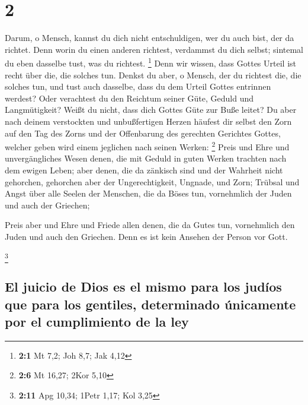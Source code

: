 \hypertarget{section-1}{%
\section{2}\label{section-1}}

 Darum, o Mensch, kannst du dich nicht entschuldigen, wer
du auch bist, der da richtet. Denn worin du einen anderen richtest,
verdammst du dich selbst; sintemal du eben dasselbe tust, was du
richtest. \footnote{\textbf{2:1} Mt 7,2; Joh 8,7; Jak 4,12}
 Denn wir wissen, dass Gottes Urteil ist recht über die,
die solches tun.  Denkst du aber, o Mensch, der du
richtest die, die solches tun, und tust auch dasselbe, dass du dem
Urteil Gottes entrinnen werdest?  Oder verachtest du den
Reichtum seiner Güte, Geduld und Langmütigkeit? Weißt du nicht, dass
dich Gottes Güte zur Buße leitet?  Du aber nach deinem
verstockten und unbußfertigen Herzen häufest dir selbst den Zorn auf den
Tag des Zorns und der Offenbarung des gerechten Gerichtes Gottes,
 welcher geben wird einem jeglichen nach seinen Werken:
\footnote{\textbf{2:6} Mt 16,27; 2Kor 5,10}  Preis und
Ehre und unvergängliches Wesen denen, die mit Geduld in guten Werken
trachten nach dem ewigen Leben;  aber denen, die da
zänkisch sind und der Wahrheit nicht gehorchen, gehorchen aber der
Ungerechtigkeit, Ungnade, und Zorn;  Trübsal und Angst
über alle Seelen der Menschen, die da Böses tun, vornehmlich der Juden
und auch der Griechen;

 Preis aber und Ehre und Friede allen denen, die da Gutes
tun, vornehmlich den Juden und auch den Griechen.  Denn
es ist kein Ansehen der Person vor Gott.

\footnote{\textbf{2:11} Apg 10,34; 1Petr 1,17; Kol 3,25}

\hypertarget{el-juicio-de-dios-es-el-mismo-para-los-juduxedos-que-para-los-gentiles-determinado-uxfanicamente-por-el-cumplimiento-de-la-ley}{%
\subsection{El juicio de Dios es el mismo para los judíos que para los
gentiles, determinado únicamente por el cumplimiento de la
ley}\label{el-juicio-de-dios-es-el-mismo-para-los-juduxedos-que-para-los-gentiles-determinado-uxfanicamente-por-el-cumplimiento-de-la-ley}}

